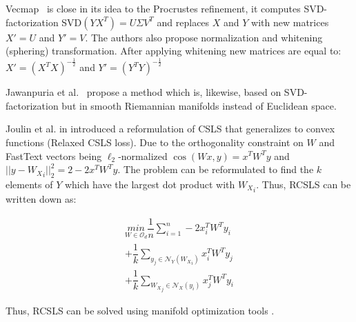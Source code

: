 \documentclass[11pt,a4paper]{article}
\begin{document}
Vecmap~\cite{vecmap} is close in its idea to the Procrustes refinement, it computes SVD-factorization SVD$(YX^T) = U\Sigma V^T$ and replaces $X$ and $Y$ with new matrices $X' = U$ and $Y' = V$. The authors also propose normalization and whitening (sphering) transformation. After applying whitening new matrices are equal to:
$X' = {({X^T}X)}^{-\tfrac{1}{2}}$ and $Y' = {({Y^T}Y)}^{-\tfrac{1}{2}}$

Jawanpuria et al.~\cite{jawanpuria} propose a method which is, likewise, based on SVD-factorization but in smooth Riemannian manifolds instead of Euclidean space.

Joulin et al. in \citeyear{joulin2018loss} introduced a reformulation of CSLS that generalizes to convex functions (Relaxed CSLS loss). Due to the orthogonality constraint on $W$ and FastText vectors being $\ell_2$-normalized $\cos(Wx, y) = x^T W^Ty$ and $|| y - {W_X}_i ||^2_2 = 2 - 2x^TW^Ty$. The problem can be reformulated to find the $k$ elements of $Y$ which have the largest dot product with ${W_X}_i$. Thus, RCSLS can be written down as:

	\begin{align*}
	\underset{W \in  \mathcal O_d}{min} \dfrac{1}{n}\sum_{i=1}^{n} - 2x^T_iW^Ty_i \\
	+ \dfrac{1}{k} \sum_{y_j \in \mathcal{N}_Y({W_X}_i)}^{ } x_i^T W^Ty_j \\
	+ \dfrac{1}{k} \sum_{{W_X}_j \in \mathcal{N}_X(y_i)}^{ } x_j^T W^Ty_i
	\end{align*}

Thus, RCSLS can be solved using manifold optimization tools \cite{boumal2014manopt}.
\end{document}
